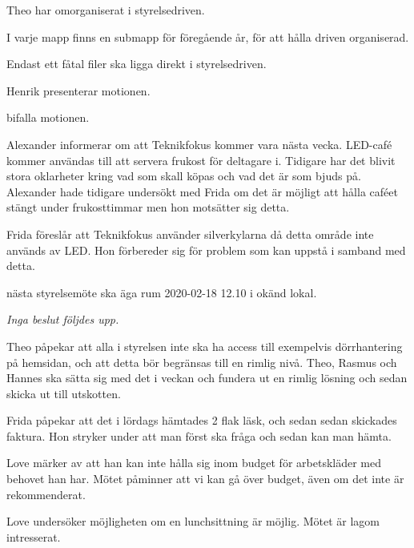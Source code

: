 \documentclass[10pt]{article}
\begin{document}
\begin{paragrafer}
Theo har omorganiserat i styrelsedriven.

I varje mapp finns en submapp för föregående år, för att hålla driven organiserad.

Endast ett fåtal filer ska ligga direkt i styrelsedriven.


Henrik presenterar motionen.

\Mdf

\Mba bifalla motionen.


Alexander informerar om att Teknikfokus kommer vara nästa vecka.
LED-café kommer användas till att servera frukost för deltagare i.
Tidigare har det blivit stora oklarheter kring vad som skall köpas och vad det är som bjuds på.
Alexander hade tidigare undersökt med Frida om det är möjligt att hålla caféet stängt under frukosttimmar men hon motsätter sig detta.

Frida föreslår att Teknikfokus använder silverkylarna då detta område inte används av LED.
Hon förbereder sig för problem som kan uppstå i samband med detta.


\Mba nästa styrelsemöte ska äga rum 2020-02-18 12.10 i okänd lokal.




\textit{Inga beslut följdes upp.}


Theo påpekar att alla i styrelsen inte ska ha access till exempelvis dörrhantering på hemsidan, och att detta bör begränsas till en rimlig nivå.
Theo, Rasmus och Hannes ska sätta sig med det i veckan och fundera ut en rimlig lösning och sedan skicka ut till utskotten.

Frida påpekar att det i lördags hämtades 2 flak läsk, och sedan sedan skickades faktura.
Hon stryker under att man först ska fråga och sedan kan man hämta.

Love märker av att han kan inte hålla sig inom budget för arbetskläder med behovet han har.
Mötet påminner att vi kan gå över budget, även om det inte är rekommenderat.

Love undersöker möjligheten om en lunchsittning är möjlig.
Mötet är lagom intresserat.


\end{paragrafer}
\end{document}
